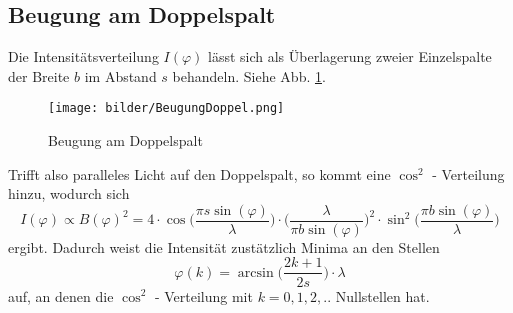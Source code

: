 \subsection{Beugung am Doppelspalt}
Die Intensitätsverteilung $I(\varphi)$ lässt sich als Überlagerung zweier
Einzelspalte der Breite $b$ im Abstand $s$ behandeln. Siehe Abb. \ref{fig:BeugungDoppel}.
\begin{figure}
  \centering
  \texttt{[image: bilder/BeugungDoppel.png]}
  \caption{Beugung am Doppelspalt \cite{406}}
  \label{fig:BeugungDoppel}
\end{figure}
Trifft also paralleles Licht auf den Doppelspalt, so kommt eine $\cos^2$ - Verteilung
hinzu, wodurch sich
\begin{equation}
  I(\varphi) \propto B(\varphi)^2= 4\cdot \cos{\bigg(\frac{\pi s \sin{(\varphi)}}{\lambda}\bigg)}
  \cdot \bigg(\frac{\lambda}{\pi b \sin{(\varphi)}}\bigg)^2 \cdot
  \sin^2{\bigg(\frac{\pi b \sin{(\varphi)}}{\lambda}\bigg)}
\end{equation}
ergibt. Dadurch weist die Intensität zustätzlich Minima an den Stellen
\begin{equation}
  \varphi(k) = \arcsin{\bigg(\frac{2k+1}{2s}\bigg)} \cdot \lambda
\end{equation}
auf, an denen die $\cos^2$ - Verteilung mit $k = 0, 1, 2, ..$ Nullstellen hat.

